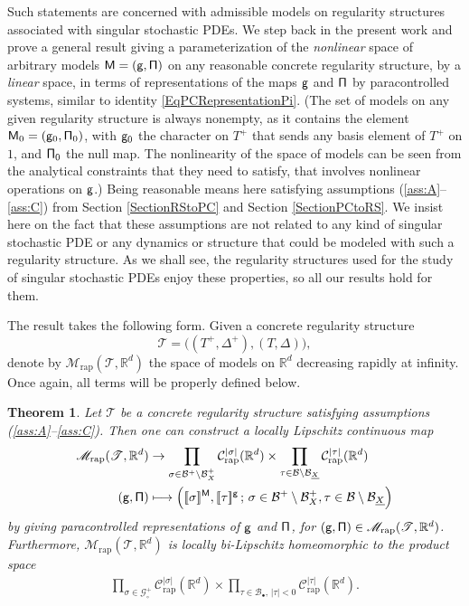 \documentclass[11pt]{article}
\numberwithin{equation}{section}
\newcommand\mto{\mathchoice{\longmapsto}{\mapsto}{\mapsto}{\mapsto}}
\newcommand{\sbullet}{{\scriptscriptstyle\bullet}}
\theoremstyle{plain}
\newtheorem{thm}{Theorem}
\theoremstyle{definition}
\newcommand{\Brac}[1]{[\![#1]\!]}
\newcommand{\rap}{\mathrm{rap}}
\newcommand{\scrM}{\mathscr{M}}
\newcommand{\scrT}{\mathscr{T}}
\newcommand{\bbR}{\mathbb{R}}
\newcommand{\mcB}{\mathcal{B}}
\newcommand{\mcC}{\mathcal{C}}
\newcommand{\mcG}{\mathcal{G}}
\begin{document}
Such statements are concerned with admissible models on regularity structures associated with singular stochastic PDEs. We step back in the present work and prove a general result giving a parameterization of the \emph{nonlinear} space of arbitrary models $\sf M=(g,\Pi)$ on any reasonable concrete regularity structure, by a \emph{linear} space, in terms of representations of the maps $\sf g$ and $\sf \Pi$ by paracontrolled systems, similar to identity \eqref{EqPCRepresentationPi}. (The set of models on any given regularity structure is always nonempty, as it contains the element ${\sf M}_0 = ({\sf g}_0, {\sf \Pi}_0)$, with ${\sf g}_0$ the character on $T^+$ that sends any basis element of $T^+$ on $1$, and ${\sf \Pi}_0$ the null map. The nonlinearity of the space of models can be seen from the analytical constraints that they need to satisfy, that involves nonlinear operations on $\sf g$.) Being reasonable means here satisfying assumptions \hbox{(\ref{ass:A}--\ref{ass:C})} from Section \ref{SectionRStoPC} and Section \ref{SectionPCtoRS}. We insist here on the fact that these assumptions are not related to any kind of singular stochastic PDE or any dynamics or structure that could be modeled with such a regularity structure. As we shall see, the regularity structures used for the study of singular stochastic PDEs enjoy these properties, so all our results hold for them.

The result takes the following form. Given a concrete regularity structure
\[
\scrT=\bigl((T^+,\Delta^+), (T,\Delta)\bigr),
\]
denote by $\scrM_\rap(\scrT, \bbR^d)$ the space of models on $\bbR^d$ decreasing rapidly at infinity. Once again, all terms will be properly defined below.

\begin{thm}\label{mainthm1}
Let $\scrT$ be a concrete regularity structure satisfying assumptions \textup{(\ref{ass:A}--\ref{ass:C})}. Then one can construct a locally Lipschitz continuous map
\begin{equation} \begin{split} \label{EqMapModelsToRemainders}
\scrM_\rap(\scrT, \bbR^d) &\to
\prod_{\sigma\in\mcB^+\setminus\mcB_X^+} \mcC_\rap^{|\sigma|}(\bbR^d) \times \prod_{\tau\in\mcB\setminus\mcB_{\underline{X}}} \mcC_\rap^{|\tau|}(\bbR^d) \\
{\sf (g,\Pi)} &\mto \Bigl(\Brac{\sigma}^{\sf M}, \Brac{\tau}^{\sf g}\,;\, \sigma\in\mcB^+\setminus\mcB_X^+, \tau\in\mcB\setminus\mcB_{\underline{X}} \Bigr)
\end{split} \end{equation}
by giving paracontrolled representations of $\sf g$ and $\sf \Pi$, for $({\sf g}, {\sf \Pi})\in \scrM_\rap(\scrT, \bbR^d)$. Furthermore, $\scrM_\rap(\scrT, \bbR^d)$ is locally bi-Lipschitz homeomorphic to the product space
\begin{align} \label{EqParametrizationThm1}
\prod_{\sigma\in\mcG_\circ^+} \mcC_\rap^{|\sigma|}(\bbR^d) \times \prod_{\tau\in\mcB_\sbullet,\,|\tau|<0} \mcC_\rap^{|\tau|}(\bbR^d).
\end{align}
\end{thm}
\end{document}

